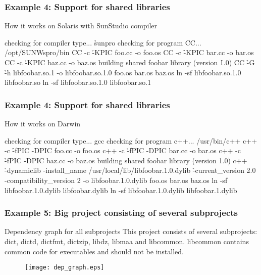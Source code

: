 \documentclass[hyperref={colorlinks=true}]{beamer}
\begin{document}
\begin{frame}[fragile]
  \frametitle{Example 4: Support for shared libraries}

  \begin{block}{How it works on Solaris with SunStudio compiler}
\begin{CodeNoLabel}
checking for compiler type... \h{sunpro}
checking for program CC... /opt/SUNWspro/bin
CC -c \h{-KPIC} foo.cc -o foo.os
CC -c \h{-KPIC} bar.cc -o bar.os
CC -c \h{-KPIC} baz.cc -o baz.os
building shared foobar library (version \h{1.0})
CC \h{-G} \h{-h libfoobar.so.1}
   -o libfoobar.so.1.0  foo.os bar.os baz.os
ln -sf libfoobar.so.1.0 libfoobar.so
ln -sf libfoobar.so.1.0 libfoobar.so.1
\prompt{\$}
\end{CodeNoLabel}
  \end{block}
\end{frame}

\begin{frame}[fragile]
  \frametitle{Example 4: Support for shared libraries}

  \begin{block}{How it works on Darwin}
\begin{CodeNoLabel}
checking for compiler type... gcc
checking for program c++... /usr/bin/c++
c++    -c \h{-fPIC -DPIC} foo.cc -o foo.os
c++    -c \h{-fPIC -DPIC} bar.cc -o bar.os
c++    -c \h{-fPIC -DPIC} baz.cc -o baz.os
building shared foobar library (version 1.0)
c++ \h{-dynamiclib -install\_name}
   /usr/local/lib/libfoobar.1.0.\h{dylib}
   \h{-current\_version 2.0 -compatibility\_version 2} 
   -o libfoobar.1.0.dylib  foo.os bar.os baz.os
ln -sf libfoobar.1.0.dylib libfoobar.dylib
ln -sf libfoobar.1.0.dylib libfoobar.1.dylib
\prompt{\$}
\end{CodeNoLabel}
  \end{block}
\end{frame}

\begin{frame}[fragile]
  \frametitle{Example 5: Big project consisting of several subprojects}

  \begin{block}{Dependency graph for all subprojects}
This project consists of several subprojects: dict, dictd, dictfmt,
dictzip, libdz, libmaa and libcommon. libcommon contains common code
for executables and should not be installed.
    \begin{figure}
      \texttt{[image: dep\_graph.eps]}
    \end{figure}
  \end{block}
\end{frame}
\end{document}
